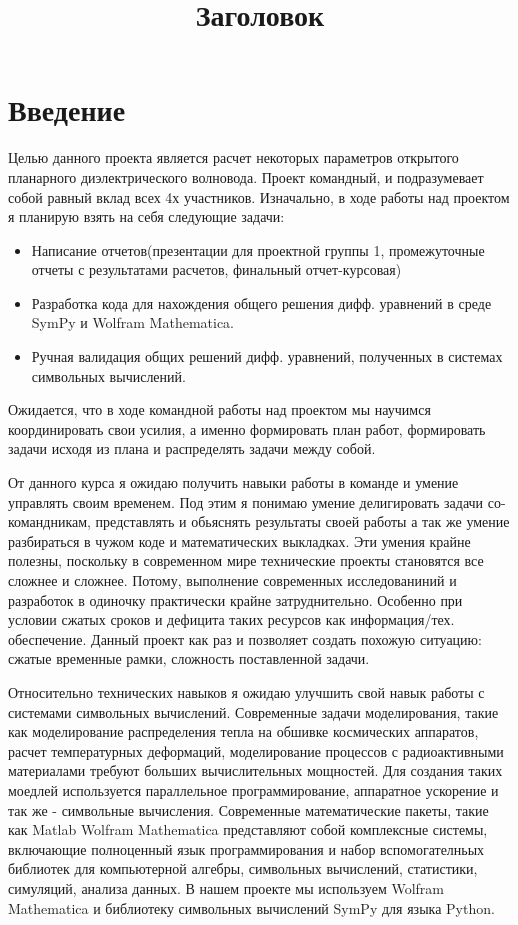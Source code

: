 \documentclass{article}
\title{Заголовок}
\begin{document}
\tableofcontents

\newpage

\section{Введение}

Целью данного проекта является расчет некоторых параметров открытого планарного диэлектрического волновода.
Проект командный, и подразумевает собой равный вклад всех 4х участников. Изначально, в ходе работы над проектом я планирую взять на себя следующие задачи:
\begin{itemize}
    \item Написание отчетов(презентации для проектной группы 1, промежуточные отчеты с результатами расчетов, финальный отчет-курсовая)
    \item Разработка кода для нахождения общего решения дифф. уравнений в среде SymPy и Wolfram Mathematica.
    \item Ручная валидация общих решений дифф. уравнений, полученных в системах символьных вычислений.
\end{itemize}

Ожидается, что в ходе командной работы над проектом мы научимся координировать свои усилия, а именно формировать план работ, формировать задачи исходя из плана и распределять задачи между собой.\\[10pt]\par
От данного курса я ожидаю получить навыки работы в команде и умение управлять своим временем. Под этим я понимаю умение делигировать задачи со-командникам, представлять и обьяснять результаты своей работы а так же умение разбираться в чужом коде и математических выкладках. Эти умения крайне полезны, поскольку в современном мире технические проекты становятся все сложнее и сложнее. Потому, выполнение современных исследованиний и разработок в одиночку практически крайне затруднительно. Особенно при условии сжатых сроков и дефицита таких ресурсов как информация/тех. обеспечение. Данный проект как раз и позволяет создать похожую ситуацию: сжатые временные рамки, сложность поставленной задачи.\\[10pt] \par
Относительно технических навыков я ожидаю улучшить свой навык работы с системами символьных вычислений. Современные задачи моделирования, такие как моделирование распределения тепла на обшивке космических аппаратов, расчет температурных деформаций, моделирование процессов с радиоактивными материалами требуют больших вычислительных мощностей. Для создания таких моедлей используется параллельное программирование, аппаратное ускорение и так же - символьные вычисления. Современные математические пакеты, такие как Matlab  Wolfram Mathematica представляют собой комплексные системы, включающие полноценный язык программирования и набор вспомогателньых библиотек для компьютерной алгебры, символьных вычислений, статистики, симуляций, анализа данных. В нашем проекте мы используем Wolfram Mathematica и библиотеку символьных вычислений SymPy для языка Python. 
\newpage
\end{document}
